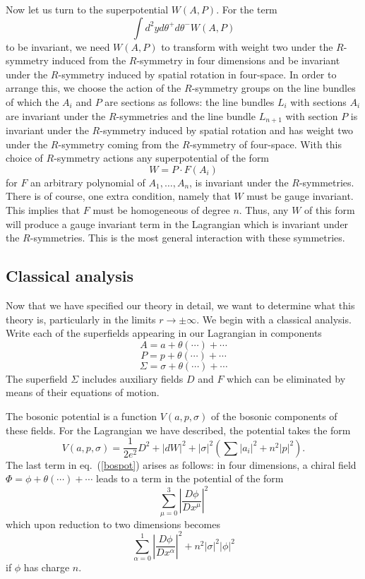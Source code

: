 Now let us turn to the superpotential $W(A,P)$. For the term
$$\int d^2yd\theta^+d\theta^-W(A,P)$$
to be invariant, we need $W(A,P)$ to transform with weight two under
the $R$-symmetry induced from the $R$-symmetry in four dimensions and
be invariant under the $R$-symmetry induced by spatial rotation in
four-space.
In order to arrange this, we choose the action of the $R$-symmetry
groups on the line bundles of which the $A_i$  and $P$ are sections as
follows:
the line bundles $L_i$ with sections $A_i$  are invariant under the
$R$-symmetries and the line bundle $L_{n+1}$ with section $P$ is
invariant under  the $R$-symmetry induced
by spatial rotation and has weight two under the $R$-symmetry coming
from the $R$-symmetry of four-space. With this choice of $R$-symmetry
actions any superpotential of the form
$$W=P\cdot F(A_i)$$
for $F$ an arbitrary polynomial of $A_1,\ldots, A_n$, is invariant under
the $R$-symmetries.
There is of course, one extra condition, namely that $W$ must be gauge
invariant. This implies that $F$ must be homogeneous of degree $n$.
Thus, any $W$ of this form will produce a gauge invariant
term in the Lagrangian which is invariant under the $R$-symmetries.
This is the most general interaction with these symmetries.










\subsection{Classical analysis}

Now that we have specified our theory in detail, we
 want to determine what this theory is, particularly in the limits
$r\to\pm\infty$.  We begin with a classical
analysis.  Write each of the superfields appearing in our Lagrangian
in components
$$A=a+\theta(\cdots)+\cdots$$
$$P=p+\theta(\cdots)+\cdots$$
$$\Sigma=\sigma+\theta(\cdots)+\cdots$$
The superfield $\Sigma$ includes auxiliary fields $D$ and $F$ which can be
eliminated by means of their equations of motion.

The bosonic potential is a function $V(a,p,\sigma)$ of the bosonic
components of these fields.  For the Lagrangian we have described, the
potential takes the form
\begin{equation}\label{bospot}
V(a,p,\sigma)
=\frac1{2e^2}D^2+|dW|^2+|\sigma|^2\left(\sum|a_i|^2+n^2|p|^2\right).
\end{equation}
The last term
in eq.~(\ref{bospot}) arises as follows: in four dimensions, a
chiral field $\Phi=\phi+\theta(\cdots)+\cdots$ leads to a term in the
potential of the form
$$\sum_{\mu=0}^3\left|\frac{D\phi}{Dx^\mu}\right|^2$$
which upon reduction to two dimensions becomes
$${} \sum_{\alpha=0}^1\left|\frac{D\phi}{Dx^\alpha}\right|^2
+n^2|\sigma|^2|\phi|^2$$
if $\phi$ has charge $n$.

